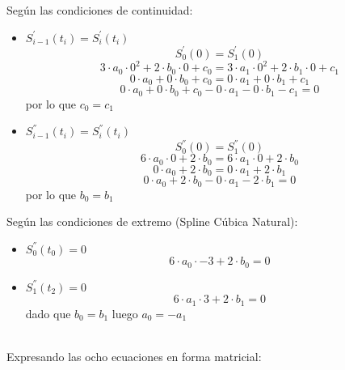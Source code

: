 \documentclass{article}
\begin{document}
Según las condiciones de continuidad:
\begin{itemize}
    \item $S^{'}_{i-1}(t_i)=S^{'}_{i}(t_i)$\\
    \[S^{'}_{0}(0)=S^{'}_{1}(0)\]
    \[3 \cdot a_0 \cdot 0^2 + 2 \cdot b_0 \cdot 0 + c_0 = 3 \cdot a_1 \cdot 0^2 + 2 \cdot b_1 \cdot 0 + c_1\]
    \[0 \cdot a_0 + 0 \cdot b_0 + c_0 = 0 \cdot a_1 + 0 \cdot b_1 + c_1\]
    \[0 \cdot a_0 + 0 \cdot b_0 + c_0 - 0 \cdot a_1 - 0 \cdot b_1 - c_1 = 0\]
    por lo que $c_0 = c_1$

    \item $S^{''}_{i-1}(t_i)=S^{''}_{i}(t_i)$\\
    \[S^{''}_{0}(0)=S^{''}_{1}(0)\]
    \[6 \cdot a_0 \cdot 0 + 2 \cdot b_0 = 6 \cdot a_1 \cdot 0 + 2 \cdot b_0 \]
    \[0 \cdot a_0 + 2 \cdot b_0 = 0 \cdot a_1 + 2 \cdot b_1 \]
    \[0 \cdot a_0 + 2 \cdot b_0 - 0 \cdot a_1 - 2 \cdot b_1 = 0\]
    por lo que $b_0 = b_1$
\end{itemize}

Según las condiciones de extremo (Spline Cúbica Natural):
\begin{itemize}
    \item $S^{''}_0(t_0)=0$\\
    \[6 \cdot a_0 \cdot -3 + 2 \cdot b_0 = 0\]
    \item $S^{''}_1(t_2)=0$\\
    \[6 \cdot a_1 \cdot 3 + 2 \cdot b_1 = 0\]
    dado que $b_0 = b_1$ luego $a_0=-a_1$
\end{itemize}\\

Expresando las ocho ecuaciones en forma matricial:\\
\end{document}
